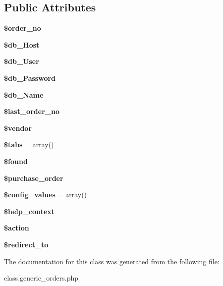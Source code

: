 \subsection*{Public Attributes}
\begin{DoxyCompactItemize}
\item 
\hypertarget{classgeneric__orders_a9a99b3d242d00f9dff29c452930cdc46}{}\label{classgeneric__orders_a9a99b3d242d00f9dff29c452930cdc46} 
{\bfseries \$order\+\_\+no}
\item 
\hypertarget{classgeneric__orders_a5b9ac946cce6674e2b7abcfd396f82ea}{}\label{classgeneric__orders_a5b9ac946cce6674e2b7abcfd396f82ea} 
{\bfseries \$db\+\_\+\+Host}
\item 
\hypertarget{classgeneric__orders_a24279845da685a00cf035df4bbe339d1}{}\label{classgeneric__orders_a24279845da685a00cf035df4bbe339d1} 
{\bfseries \$db\+\_\+\+User}
\item 
\hypertarget{classgeneric__orders_af6abeff7193a46c1785edef999aebe72}{}\label{classgeneric__orders_af6abeff7193a46c1785edef999aebe72} 
{\bfseries \$db\+\_\+\+Password}
\item 
\hypertarget{classgeneric__orders_ab37c01fb6bfad57f908e01b6c65e5d9d}{}\label{classgeneric__orders_ab37c01fb6bfad57f908e01b6c65e5d9d} 
{\bfseries \$db\+\_\+\+Name}
\item 
\hypertarget{classgeneric__orders_a723c673ed302846be920efe7ef6b656e}{}\label{classgeneric__orders_a723c673ed302846be920efe7ef6b656e} 
{\bfseries \$last\+\_\+order\+\_\+no}
\item 
\hypertarget{classgeneric__orders_a9eb2c59dd61c0dde32ff3171a522bd69}{}\label{classgeneric__orders_a9eb2c59dd61c0dde32ff3171a522bd69} 
{\bfseries \$vendor}
\item 
\hypertarget{classgeneric__orders_ae9ac8a364ccd57159c7c2f7cb9828444}{}\label{classgeneric__orders_ae9ac8a364ccd57159c7c2f7cb9828444} 
{\bfseries \$tabs} = array()
\item 
\hypertarget{classgeneric__orders_a8b5bbce48d66545ab58b43f4be772872}{}\label{classgeneric__orders_a8b5bbce48d66545ab58b43f4be772872} 
{\bfseries \$found}
\item 
\hypertarget{classgeneric__orders_ad9f0450540b7abed0a3952217421268b}{}\label{classgeneric__orders_ad9f0450540b7abed0a3952217421268b} 
{\bfseries \$purchase\+\_\+order}
\item 
\hypertarget{classgeneric__orders_aa9882dc26f8860b93d947905dfca7483}{}\label{classgeneric__orders_aa9882dc26f8860b93d947905dfca7483} 
{\bfseries \$config\+\_\+values} = array()
\item 
\hypertarget{classgeneric__orders_a0886ded57343072f2ad3821288d00454}{}\label{classgeneric__orders_a0886ded57343072f2ad3821288d00454} 
{\bfseries \$help\+\_\+context}
\item 
\hypertarget{classgeneric__orders_acfdc001bf2e21ac8d63d8265f3b2dd3f}{}\label{classgeneric__orders_acfdc001bf2e21ac8d63d8265f3b2dd3f} 
{\bfseries \$action}
\item 
\hypertarget{classgeneric__orders_ad884a4bee50042666a9c9aebece716bd}{}\label{classgeneric__orders_ad884a4bee50042666a9c9aebece716bd} 
{\bfseries \$redirect\+\_\+to}
\end{DoxyCompactItemize}


The documentation for this class was generated from the following file\+:\begin{DoxyCompactItemize}
\item 
class.\+generic\+\_\+orders.\+php\end{DoxyCompactItemize}
